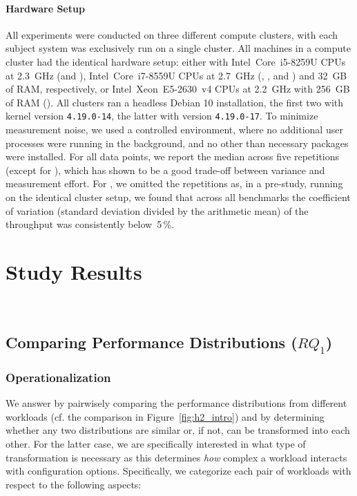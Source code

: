 \paragraph{Hardware Setup}
All experiments were conducted on three different compute clusters, with each subject system was exclusively run on a single cluster. All machines in a compute cluster had the identical hardware setup: either with Intel~Core~i5-8259U CPUs at 2.3~GHz (\jumper and \kanzi),  Intel~Core~i7-8559U CPUs at 2.7~GHz (\dconvert, \batik, and \jadx) and 32~GB of RAM, respectively, or Intel~Xeon~E5-2630~v4 CPUs at 2.2~GHz with 256~GB of RAM (\htwo). All clusters ran a headless Debian 10 installation, the first two with kernel version \mbox{\texttt{4.19.0-14}}, the latter with version \mbox{\texttt{4.19.0-17}}. 
To minimize measurement noise, we used a controlled environment, where no additional user processes were running in the background, and no other than necessary packages were installed.	For all data points, we report the median across five repetitions (except for \htwo), which has shown to be a good trade-off between variance and measurement effort. For \htwo, we omitted the repetitions as, in a pre-study, running on the identical cluster setup, we found that across all benchmarks the coefficient of variation (standard deviation divided by the arithmetic mean) of the throughput was consistently below~5\,\%.

\section{Study Results}~\label{sec:results}
\subsection{Comparing Performance Distributions ($RQ_1$)}\label{sec:rq1}
\subsubsection{Operationalization}
We answer  by pairwisely comparing the performance distributions from different workloads (cf. the comparison in Figure~\ref{fig:h2_intro}) and by determining whether any two distributions are similar or, if not, can be transformed into each other. For the latter case, we are specifically interested in what type of transformation is necessary as this determines \textit{how} complex a workload interacts with configuration options. Specifically, we categorize each pair of workloads with respect to the following aspects: 

